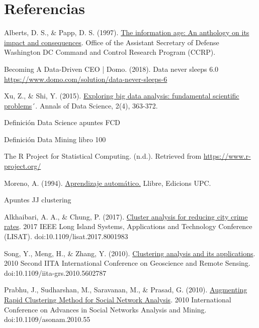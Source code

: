 \documentclass[3p,twocolumn]{elsarticle}
\begin{document}
\section{Referencias}
\renewcommand{\section}[2]{}
\begin{thebibliography}{X}

 Alberts, D. S., \& Papp, D. S. (1997). \href{http://www.dodccrp.org/files/Alberts_Anthology_I.pdf} {The information age: An anthology on its impact and consequences}. Office of the Assistant Secretary of Defense Washington DC Command and Control Research Program (CCRP).

 Becoming A Data-Driven CEO | Domo. (2018). Data never sleeps 6.0 \href{https://www.domo.com/solution/data-never-sleeps-6} {https://www.domo.com/solution/data-never-sleeps-6}

 Xu, Z., \& Shi, Y. (2015). \href {https://link.springer.com/content/pdf/10.1007/s40745-015-0063-7.pdf} {Exploring big data analysis: fundamental scientific problems}´. Annals of Data Science, 2(4), 363-372.

 Definición Data Science apuntes FCD

 Definición Data Mining libro 100

 The R Project for Statistical Computing. (n.d.). Retrieved from \href{https://www.r-project.org/} {https://www.r-project.org/}

 Moreno, A. (1994). \href{https://upcommons.upc.edu/bitstream/handle/2099.3/36157/9788483019962.pdf?sequence=1&isAllowed=y} {Aprendizaje automático.} Llibre, Edicions UPC.

 Apuntes JJ clustering

 Alkhaibari, A. A., \& Chung, P. (2017). \href{https://ieeexplore.ieee.org/document/8001983} {Cluster analysis for reducing city crime rates}. 2017 IEEE Long Island Systems, Applications and Technology Conference (LISAT). doi:10.1109/lisat.2017.8001983

 Song, Y., Meng, H., \& Zhang, Y. (2010). \href{https://ieeexplore.ieee.org/document/5602787} {Clustering analysis and its applications}. 2010 Second IITA International Conference on Geoscience and Remote Sensing. doi:10.1109/iita-grs.2010.5602787

 Prabhu, J., Sudharshan, M., Saravanan, M., \& Prasad, G. (2010). \href{https://ieeexplore.ieee.org/document/5563072} {Augmenting Rapid Clustering Method for Social Network Analysis}. 2010 International Conference on Advances in Social Networks Analysis and Mining. doi:10.1109/asonam.2010.55


\end{thebibliography}
\end{document}
